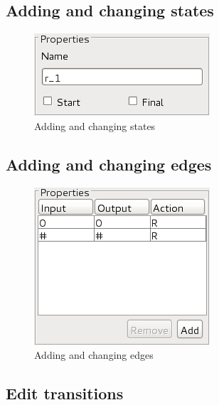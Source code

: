 \documentclass[%
  a4paper,%
  11pt,%
  blue,%
  hyperref	%
  ]{tubsartcl}
\begin{document}
\newpage

\subsection{Adding and changing states}
\label{sec:add-edit-states}

\begin{figure}[!htb]
\begin{center}
\includegraphics[scale=0.5]{graphics_gui/state_properties.png}
\end{center}
\caption{Adding and changing states}
\label{pic:state_properties}
\end{figure}

\newpage

\subsection{Adding and changing edges}
\label{sec:adding-chang-edges}

\begin{figure}[!htb]
\begin{center}
\includegraphics[scale=0.5]{graphics_gui/edge_properties.png}
\end{center}
\caption{Adding and changing edges}
\label{pic:edge_properties}
\end{figure}

\newpage

\subsection{Edit transitions}
\label{sec:edit-transitions}
\end{document}
